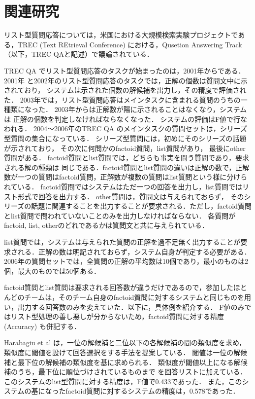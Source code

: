 \documentclass[japanese]{jnlp_1.4}
\begin{document}
\section{関連研究}

リスト型質問応答については，米国における大規模検索実験プロジェクトである，TREC (Text REtrieval Conference) における，Qusetion Answering Track（以下，TREC QAと記述）で議論されている．

TREC QA でリスト型質問応答のタスクが始まったのは，2001年からである．
2001年\linebreak
\cite{TRECoverview01}と2002年\cite{TRECoverview02}のリスト型質問応答のタスクでは，正解の個数は質問文中に示されており，
システムは示された個数の解候補を出力し，その精度で評価された．
2003年\cite{TRECoverview03}では，リスト型質問応答はメインタスクに含まれる質問のうちの一種類になった．
2003年からは正解数が陽に示されることはなくなり，システムは
正解の個数を判定しなければならなくなった．
システムの評価はF値で行なわれる．
2004〜2006年\cite{TRECoverview04}\cite{TRECoverview05}\cite{TRECoverview06}のTREC QA 
のメインタスクの質問セットは，シリーズ型質問の集合になっている．
シリーズ型質問には，初めにそのシリーズの話題が示されており，
その次に何問かのfactoid質問，list質問があり，
最後にother質問がある．
factoid質問とlist質問では，どちらも事実を問う質問であり，要求される解の種類は
同じである．factoid質問とlist質問の違いは正解の数で，正解数が一つの質問はfactoid質問，正解数が複数の質問はlist質問という様に分けられている．
factoid質問ではシステムはただ一つの回答を出力し，list質問ではリスト形式で回答を出力する．
other質問は，質問文は与えられておらず，
そのシリーズの話題に関連することを出力することが要求される．ただし，factoid質問とlist質問で問われていないことのみを出力しなければならない．
各質問がfactoid, list, otherのどれであるかは質問文と共に与えられている．

list質問では，システムは与えられた質問の正解を過不足無く出力することが要求される．正解の数は明記されておらず，システム自身が判定する必要がある．
2006年の質問セットでは，全質問の正解の平均数は10個であり，最小のものは2個，最大のものでは50個ある．

factoid質問とlist質問は要求される回答数が違うだけであるので，参加したほとんどのチームは，そのチーム自身のfactoid質問に対するシステムと同じものを用い，出力する回答数のみを変えていた．以下に，具体例を紹介する．
F値のみではリスト型処理の善し悪しが分からないため，factoid質問に対する精度 (Accuracy) も併記する．

Harabagiu et al \cite{Harabagiu:AnswerMiningbyCombiningExtractionTechniqueswithAbductiveReasoning}は，一位の解候補と二位以下の各解候補の間の類似度を求め，
類似度に閾値を設けて回答選択をする手法を提案している．
閾値は一位の解候補と最下位の解候補の類似度を基に求められる．
類似度が閾値以上になる解候補のうち，最下位に順位づけされているものまで
を回答リストに加えている．
このシステムのlist型質問に対する精度は，F値で0.433であった．
また，このシステムの基になったfactoid質問に対するシステムの精度は，0.578であった．
\end{document}
